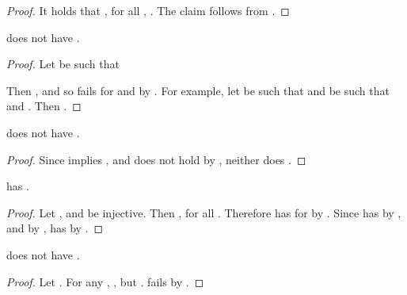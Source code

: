 \documentclass[b5paper, english, oneside]{memoir}
\begin{document}
\begin{proof}
It holds that , for all , . The claim follows from .
\end{proof}

\begin{theorem}
\label{CofiniteSubComposabilityFails}
 does not have .
\end{theorem}

\begin{proof}
Let  be such that

Then , and so  fails for  and  by . For example, let  be such that  and  be such that  and . Then .
\end{proof}

\begin{theorem}
\label{CofiniteSubsetSumFails}
 does not have .
\end{theorem}

\begin{proof}
Since  implies , and  does not hold by , neither does .
\end{proof}

\begin{theorem}
\label{CofiniteInjectiveComposition}
 has .
\end{theorem}

\begin{proof}
Let , and  be injective. Then , for all . Therefore  has  for  by . 
  
Since  has  by , and  by ,  has  by .
\end{proof}

\begin{theorem}
\label{CofiniteExtensibilityFails}
 does not have .
\end{theorem}

\begin{proof}
Let . For any , , but .  fails by .
\end{proof}
\end{document}
